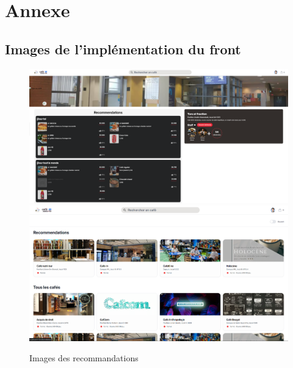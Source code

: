 \documentclass[11pt]{article}
\begin{document}
\newpage


\section*{Annexe}

\subsection*{Images de l'implémentation du front}
\label{images}

\begin{figure}[H]
\includegraphics[scale=0.3]{images/recommendation_personnalises.png} \\

\includegraphics[scale=0.3]{images/recommendation_cafe.png} \\

\caption{Images des recommandations}
\end{figure}
\end{document}
